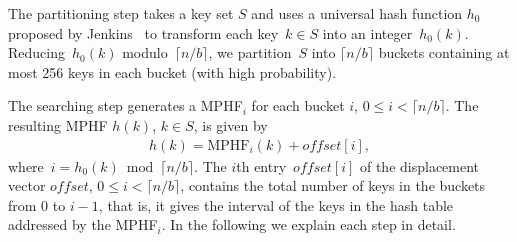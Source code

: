 The partitioning step takes a key set $S$ and uses a universal hash function 
$h_0$ proposed by Jenkins~\cite{j97} 
to transform each key~$k\in S$ into an integer~$h_0(k)$.
Reducing~$h_0(k)$ modulo~$\lceil n/b\rceil$, we partition~$S$ into $\lceil n/b
\rceil$ buckets containing at most 256 keys in each bucket (with high
probability).  

The searching step generates a MPHF$_i$ for each bucket $i$, 
$0 \leq i < \lceil n/b \rceil$.
The resulting MPHF $h(k)$, $k \in S$, is given by
\begin{eqnarray}\label{eq:mphf}
h(k) = \mathrm{MPHF}_i (k) + \mathit{offset}[i], 
\end{eqnarray}
where~$i=h_0(k)\bmod\lceil n/b\rceil$.
The $i$th entry~$\mathit{offset}[i]$ of the displacement vector
$\mathit{offset}$, $0 \leq i < \lceil n/b \rceil$, contains the total number
of keys in the buckets from 0 to $i-1$, that is, it gives the interval of the
keys in the hash table addressed by the MPHF$_i$.  In the following we explain
each step in detail.



